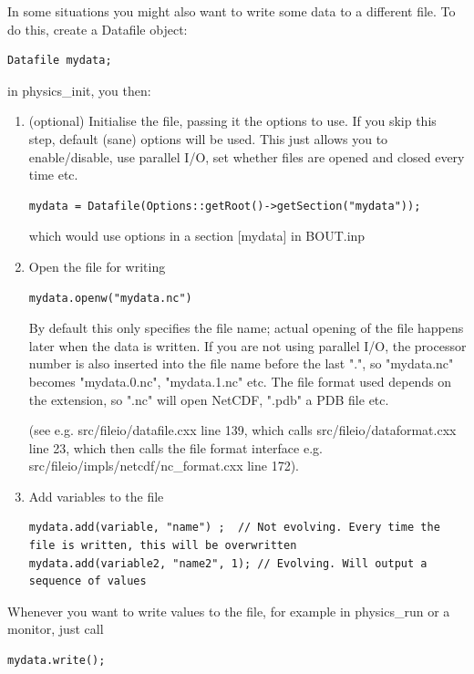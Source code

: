 \documentclass[12pt]{article}
\begin{document}
In some situations you might also want to write some data to a different file. To do this,
create a Datafile object:

\begin{lstlisting}
Datafile mydata;
\end{lstlisting}

in physics\_init, you then:

\begin{enumerate}
\item (optional) Initialise the file, passing it the options to use. If you skip this step, default (sane) options will be used. This just allows you to enable/disable, use parallel I/O, set whether files are opened and closed every time etc.
\begin{lstlisting}
mydata = Datafile(Options::getRoot()->getSection("mydata"));
\end{lstlisting}
which would use options in a section [mydata] in BOUT.inp

\item Open the file for writing
\begin{lstlisting}
mydata.openw("mydata.nc")
\end{lstlisting}
By default this only specifies the file name; actual opening of the file happens later when the data is written. If you are not using parallel I/O, the processor number is also inserted into the file name before the last ".", so "mydata.nc" becomes "mydata.0.nc", "mydata.1.nc" etc. The file format used depends on the extension, so ".nc" will open NetCDF, ".pdb" a PDB file etc.

(see e.g. src/fileio/datafile.cxx line 139, which calls src/fileio/dataformat.cxx line 23, which then calls the file format interface e.g. src/fileio/impls/netcdf/nc\_format.cxx line 172).

\item Add variables to the file
\begin{lstlisting}
mydata.add(variable, "name") ;  // Not evolving. Every time the file is written, this will be overwritten
mydata.add(variable2, "name2", 1); // Evolving. Will output a sequence of values
\end{lstlisting}
\end{enumerate}

Whenever you want to write values to the file, for example in physics\_run or a monitor, just call
\begin{lstlisting}
mydata.write();
\end{lstlisting}
\end{document}
